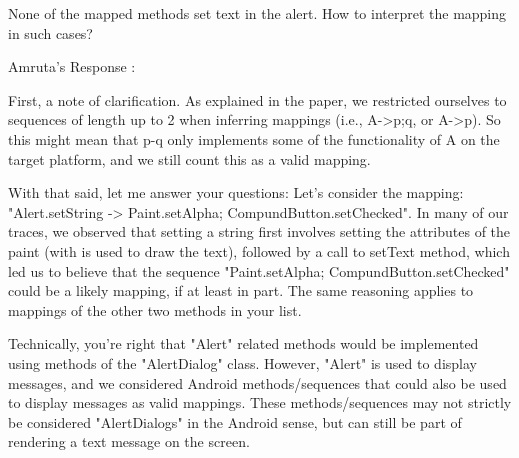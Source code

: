 
None of the mapped methods set text in the alert. How to interpret the mapping in such cases?

Amruta's Response :


First, a note of clarification. As explained in the paper, we restricted ourselves to sequences of length up to 2 when inferring mappings (i.e., {A->p;q}, or {A->p}). So this might mean that p-q only implements some of the functionality of A on the target platform, and we still count this as a valid mapping.

With that said, let me answer your questions: Let's consider the mapping: "Alert.setString -> Paint.setAlpha; CompundButton.setChecked". In many of our traces, we observed that setting a string first involves setting the attributes of the paint (with is used to draw the text), followed by a call to setText method, which led us to believe that the sequence "Paint.setAlpha; CompundButton.setChecked" could be a likely mapping, if at least in part. The same reasoning applies to mappings of the other two methods in your list. 

Technically, you're right that "Alert" related methods would be implemented using methods of the "AlertDialog" class. However, "Alert" is used to display messages, and we considered Android methods/sequences that could also be used to display messages as valid mappings. These methods/sequences may not strictly be considered "AlertDialogs" in the Android sense, but can still be part of rendering a text message on the screen. 

